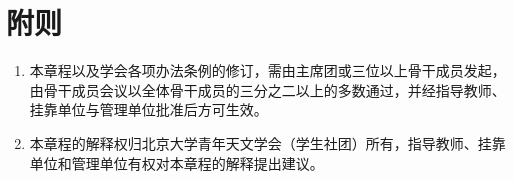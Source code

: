 \section{附则}

\begin{enumerate}[resume]
    \item 本章程以及学会各项办法条例的修订，需由主席团或三位以上骨干成员发起，由骨干成员会议以全体骨干成员的三分之二以上的多数通过，并经指导教师、挂靠单位与管理单位批准后方可生效。
    
    \item 本章程的解释权归北京大学青年天文学会（学生社团）所有，指导教师、挂靠单位和管理单位有权对本章程的解释提出建议。
\end{enumerate}